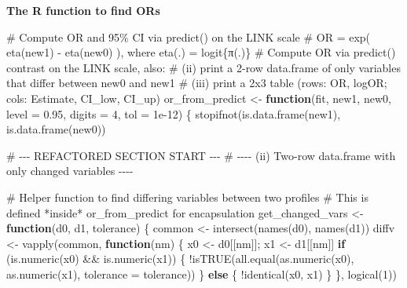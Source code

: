 \documentclass[
  letterpaper,
]{scrbook}
\newenvironment{Shaded}{\begin{snugshade}}{\end{snugshade}}
\newcommand{\AttributeTok}[1]{\textcolor[rgb]{0.40,0.45,0.13}{#1}}
\newcommand{\CommentTok}[1]{\textcolor[rgb]{0.37,0.37,0.37}{#1}}
\newcommand{\ControlFlowTok}[1]{\textcolor[rgb]{0.00,0.23,0.31}{\textbf{#1}}}
\newcommand{\DecValTok}[1]{\textcolor[rgb]{0.68,0.00,0.00}{#1}}
\newcommand{\FloatTok}[1]{\textcolor[rgb]{0.68,0.00,0.00}{#1}}
\newcommand{\FunctionTok}[1]{\textcolor[rgb]{0.28,0.35,0.67}{#1}}
\newcommand{\NormalTok}[1]{\textcolor[rgb]{0.00,0.23,0.31}{#1}}
\newcommand{\OtherTok}[1]{\textcolor[rgb]{0.00,0.23,0.31}{#1}}
\newcommand{\SpecialCharTok}[1]{\textcolor[rgb]{0.37,0.37,0.37}{#1}}
\begin{document}
\textbf{The R function to find ORs}

\begin{Shaded}
\begin{Highlighting}[]
\CommentTok{\# Compute OR and 95\% CI via predict() on the LINK scale}
\CommentTok{\# OR = exp( eta(new1) {-} eta(new0) ), where eta(.) = logit\{π(.)\}}
\CommentTok{\# Compute OR via predict() contrast on the LINK scale, also:}
\CommentTok{\# (ii) print a 2{-}row data.frame of only variables that differ between new0 and new1}
\CommentTok{\# (iii) print a 2x3 table (rows: OR, logOR; cols: Estimate, CI\_low, CI\_up)}
\NormalTok{or\_from\_predict }\OtherTok{\textless{}{-}} \ControlFlowTok{function}\NormalTok{(fit, new1, new0, }\AttributeTok{level =} \FloatTok{0.95}\NormalTok{, }\AttributeTok{digits =} \DecValTok{4}\NormalTok{, }\AttributeTok{tol =} \FloatTok{1e{-}12}\NormalTok{) \{}
  \FunctionTok{stopifnot}\NormalTok{(}\FunctionTok{is.data.frame}\NormalTok{(new1), }\FunctionTok{is.data.frame}\NormalTok{(new0))}

  \CommentTok{\# {-}{-}{-} REFACTORED SECTION START {-}{-}{-}}
  \CommentTok{\# {-}{-}{-}{-} (ii) Two{-}row data.frame with only changed variables {-}{-}{-}{-}}
  
  \CommentTok{\# Helper function to find differing variables between two profiles}
  \CommentTok{\# This is defined *inside* or\_from\_predict for encapsulation}
\NormalTok{  get\_changed\_vars }\OtherTok{\textless{}{-}} \ControlFlowTok{function}\NormalTok{(d0, d1, tolerance) \{}
\NormalTok{    common }\OtherTok{\textless{}{-}} \FunctionTok{intersect}\NormalTok{(}\FunctionTok{names}\NormalTok{(d0), }\FunctionTok{names}\NormalTok{(d1))}
\NormalTok{    diffv  }\OtherTok{\textless{}{-}} \FunctionTok{vapply}\NormalTok{(common, }\ControlFlowTok{function}\NormalTok{(nm) \{}
\NormalTok{      x0 }\OtherTok{\textless{}{-}}\NormalTok{ d0[[nm]]; x1 }\OtherTok{\textless{}{-}}\NormalTok{ d1[[nm]]}
      \ControlFlowTok{if}\NormalTok{ (}\FunctionTok{is.numeric}\NormalTok{(x0) }\SpecialCharTok{\&\&} \FunctionTok{is.numeric}\NormalTok{(x1)) \{}
        \SpecialCharTok{!}\FunctionTok{isTRUE}\NormalTok{(}\FunctionTok{all.equal}\NormalTok{(}\FunctionTok{as.numeric}\NormalTok{(x0), }\FunctionTok{as.numeric}\NormalTok{(x1), }\AttributeTok{tolerance =}\NormalTok{ tolerance))}
\NormalTok{      \} }\ControlFlowTok{else}\NormalTok{ \{}
        \SpecialCharTok{!}\FunctionTok{identical}\NormalTok{(x0, x1)}
\NormalTok{      \}}
\NormalTok{    \}, }\FunctionTok{logical}\NormalTok{(}\DecValTok{1}\NormalTok{))}
    

\end{Highlighting}
\end{Shaded}
\end{document}
